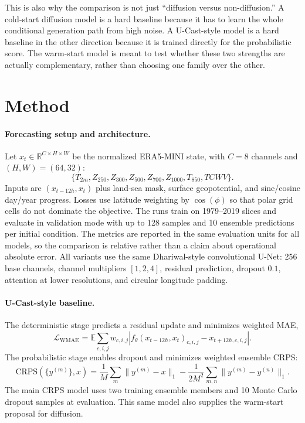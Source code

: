 \documentclass{article}
\begin{document}
This is also why the comparison is not just ``diffusion versus non-diffusion.'' A cold-start diffusion model is a hard baseline because it has to learn the whole conditional generation path from high noise. A U-Cast-style model is a hard baseline in the other direction because it is trained directly for the probabilistic score. The warm-start model is meant to test whether these two strengths are actually complementary, rather than choosing one family over the other.

\section{Method}

\paragraph{Forecasting setup and architecture.}
Let $x_t\in\mathbb{R}^{C\times H\times W}$ be the normalized ERA5-MINI state, with $C=8$ channels and $(H,W)=(64,32)$:
\[
\{T_{2m}, Z_{250}, Z_{300}, Z_{500}, Z_{700}, Z_{1000}, T_{850}, TCWV\}.
\]
Inputs are $(x_{t-12h},x_t)$ plus land-sea mask, surface geopotential, and sine/cosine day/year progress. Losses use latitude weighting by $\cos(\phi)$ so that polar grid cells do not dominate the objective. The runs train on 1979--2019 slices and evaluate in validation mode with up to 128 samples and 10 ensemble predictions per initial condition. The metrics are reported in the same evaluation units for all models, so the comparison is relative rather than a claim about operational absolute error. All variants use the same Dhariwal-style convolutional U-Net: 256 base channels, channel multipliers $[1,2,4]$, residual prediction, dropout $0.1$, attention at lower resolutions, and circular longitude padding.

\paragraph{U-Cast-style baseline.}
The deterministic stage predicts a residual update and minimizes weighted MAE,
\[
\mathcal{L}_{\mathrm{WMAE}}
=
\mathbb{E}\sum_{c,i,j} w_{c,i,j}
\left| f_\theta(x_{t-12h},x_t)_{c,i,j}-x_{t+12h,c,i,j}\right|.
\]
The probabilistic stage enables dropout and minimizes weighted ensemble CRPS:
\[
\mathrm{CRPS}(\{y^{(m)}\},x)=
\frac{1}{M}\sum_m\lVert y^{(m)}-x\rVert_1
-
\frac{1}{2M^2}\sum_{m,n}\lVert y^{(m)}-y^{(n)}\rVert_1.
\]
The main CRPS model uses two training ensemble members and 10 Monte Carlo dropout samples at evaluation. This same model also supplies the warm-start proposal for diffusion.
\end{document}
